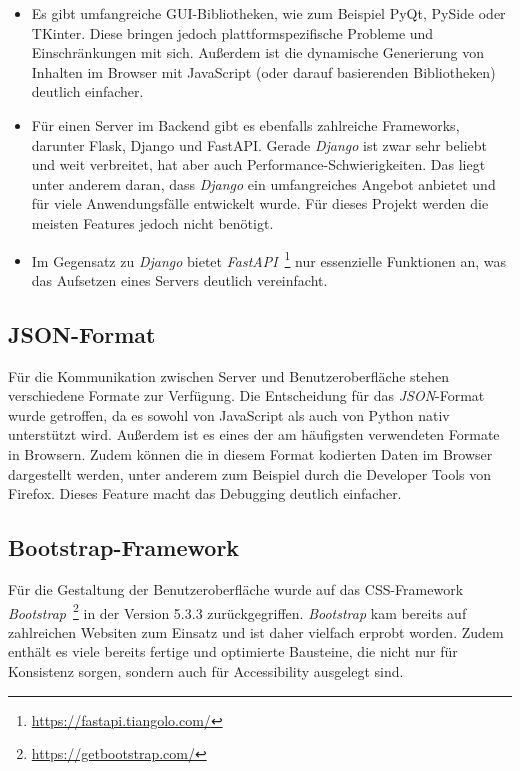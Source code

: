 \begin{itemize}
    \item Es gibt umfangreiche GUI-Bibliotheken, wie zum Beispiel PyQt, PySide oder TKinter. Diese bringen jedoch plattformspezifische Probleme und Einschränkungen mit sich.
    Außerdem ist die dynamische Generierung von Inhalten im Browser mit JavaScript (oder darauf basierenden Bibliotheken) deutlich einfacher.
    \item Für einen Server im Backend gibt es ebenfalls zahlreiche Frameworks, darunter Flask, Django und FastAPI.
    Gerade \textit{Django} ist zwar sehr beliebt und weit verbreitet, hat aber auch Performance-Schwierigkeiten.
    Das liegt unter anderem daran, dass \textit{Django} ein umfangreiches Angebot anbietet und für viele Anwendungsfälle entwickelt wurde.
    Für dieses Projekt werden die meisten Features jedoch nicht benötigt.
    \item Im Gegensatz zu \textit{Django} bietet \textit{FastAPI}~\footnote{\hspace{1.5mm}\url{https://fastapi.tiangolo.com/}} nur essenzielle Funktionen an, was das Aufsetzen eines Servers deutlich vereinfacht.
\end{itemize}

\subsection{JSON-Format}

Für die Kommunikation zwischen Server und Benutzeroberfläche stehen verschiedene Formate zur Verfügung. Die Entscheidung für das \textit{JSON}-Format wurde getroffen, 
da es sowohl von JavaScript als auch von Python nativ unterstützt wird. Außerdem ist es eines der am häufigsten verwendeten Formate in Browsern.
Zudem können die in diesem Format kodierten Daten im Browser dargestellt werden, unter anderem
zum Beispiel durch die Developer Tools von Firefox. Dieses Feature macht das Debugging deutlich einfacher. 

\subsection{Bootstrap-Framework}

Für die Gestaltung der Benutzeroberfläche wurde auf das CSS-Framework \textit{Bootstrap}~\footnote{\hspace{1.5mm}\url{https://getbootstrap.com/}} in der Version 5.3.3 zurückgegriffen.
\textit{Bootstrap} kam bereits auf zahlreichen Websiten zum Einsatz und ist daher vielfach erprobt worden.
Zudem enthält es viele bereits fertige und optimierte Bausteine, die nicht nur für Konsistenz sorgen, sondern auch für Accessibility ausgelegt sind. 
